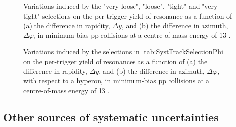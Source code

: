 \begin{figure}[!p]
\centering
{}
\centering
{}
\caption{Variations induced by the "very loose", "loose", "tight" and "very tight"  \rmXiPM selections on the per-trigger yield of \rmPhiMes resonance as a function of (a) the difference in rapidity, $\Delta y$, and (b) the difference in azimuth, $\Delta \varphi$, in minimum-bias pp collisions at a centre-of-mass energy of 13 \tev.}
	\label{fig:SystPerTriggerYieldXiRatioCascade}
\end{figure}

\begin{figure}[!p]
\centering
{}
\centering
{}
\caption{Variations induced by the selections in \tab\ref{tab:SystTrackSelectionPhi} on the per-trigger yield of \rmPhiMes resonances as a function of (a) the difference in rapidity, $\Delta y$, and (b) the difference in azimuth, $\Delta \varphi$, with respect to a \rmXi hyperon, in minimum-bias pp collisions at a centre-of-mass energy of 13 \tev.}
	\label{fig:SystPerTriggerYieldXiRatio}
\end{figure}

\clearpage

\subsection{Other sources of systematic uncertainties}

